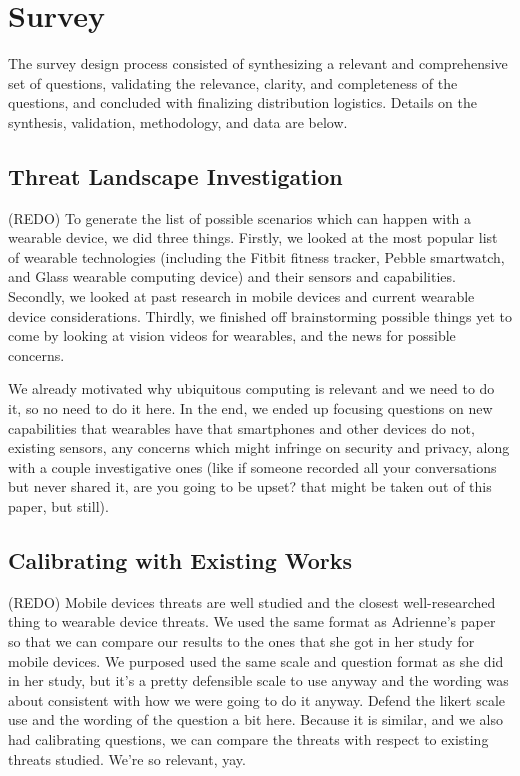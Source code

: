 \documentclass{acm_proc_article-sp}
\begin{document}

\section{Survey}
The survey design process consisted of synthesizing a relevant and comprehensive set of questions, validating the relevance, clarity, and completeness of the questions, and concluded with finalizing distribution logistics. Details on the synthesis, validation, methodology, and data are below.

\subsection{Threat Landscape Investigation} 
(REDO) To generate the list of possible scenarios which can happen with a wearable device, we did three things. Firstly, we looked at the most popular list of wearable technologies (including the Fitbit fitness tracker, Pebble smartwatch, and Glass wearable computing device) and their sensors and capabilities. Secondly, we looked at past research in mobile devices and current wearable device considerations. Thirdly, we finished off brainstorming possible things yet to come by looking at vision videos for wearables, and the news for possible concerns. 

We already motivated why ubiquitous computing is relevant and we need to do it, so no need to do it here. In the end, we ended up focusing questions on new capabilities that wearables have that smartphones and other devices do not, existing sensors, any concerns which might infringe on security and privacy, along with a couple investigative ones (like if someone recorded all your conversations but never shared it, are you going to be upset? that might be taken out of this paper, but still). 

\subsection{Calibrating with Existing Works}
(REDO) Mobile devices threats are well studied and the closest well-researched thing to wearable device threats. We used the same format as Adrienne's paper so that we can compare our results to the ones that she got in her study for mobile devices. We purposed used the same scale and question format as she did in her study, but it's a pretty defensible scale to use anyway and the wording was about consistent with how we were going to do it anyway. Defend the likert scale use and the wording of the question a bit here. Because it is similar, and we also had calibrating questions, we can compare the threats with respect to existing threats studied. We're so relevant, yay. 
\end{document}
